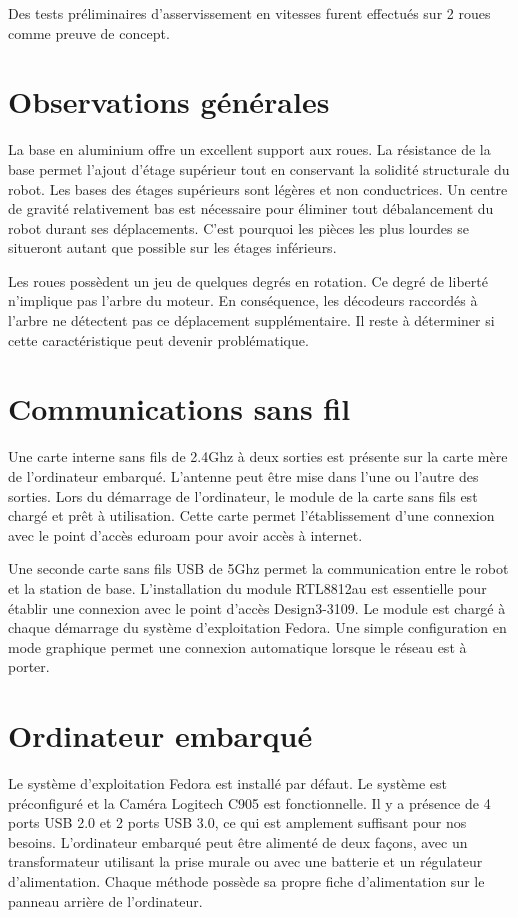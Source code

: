Des tests préliminaires d'asservissement en vitesses furent effectués sur 2 roues comme preuve de concept. 

\section{Observations générales}
  La base en aluminium offre un excellent support aux roues. La résistance de la base permet l’ajout d’étage supérieur tout en conservant la solidité structurale du robot. Les bases des étages supérieurs sont légères et non conductrices. Un centre de gravité relativement bas est nécessaire pour éliminer tout débalancement du robot durant ses déplacements. C’est pourquoi les pièces les plus lourdes se situeront autant que possible sur les étages inférieurs.

Les roues possèdent un jeu de quelques degrés en rotation. Ce degré de liberté n’implique pas l’arbre du moteur. En conséquence, les décodeurs raccordés à l’arbre ne détectent pas ce déplacement supplémentaire. Il reste à déterminer si cette caractéristique peut devenir problématique. 


\section{Communications sans fil}
 Une carte interne sans fils de 2.4Ghz à deux sorties est présente sur la carte mère de l’ordinateur embarqué. L’antenne peut être mise dans l’une ou l’autre des sorties. Lors du démarrage de l’ordinateur, le module de la carte sans fils est chargé et prêt à utilisation. Cette carte permet l’établissement d’une connexion avec le point d’accès eduroam pour avoir accès à internet. 
 
 Une seconde carte sans fils USB de 5Ghz permet la communication entre le robot et la station de base. L’installation du module RTL8812au est essentielle pour établir une connexion avec le point d’accès Design3-3109. Le module est chargé à chaque démarrage du système d’exploitation Fedora. Une simple configuration en mode graphique permet une connexion automatique lorsque le réseau est à porter. 

\section{Ordinateur embarqué}
 Le système d’exploitation Fedora est installé par défaut. Le système est préconfiguré et la Caméra Logitech C905 est fonctionnelle.  Il y a présence de 4 ports USB 2.0 et 2 ports USB 3.0, ce qui est amplement suffisant pour nos besoins. L’ordinateur embarqué peut être alimenté de deux façons, avec un transformateur utilisant la prise murale ou avec une batterie et un régulateur d’alimentation. Chaque méthode possède sa propre fiche d’alimentation sur le panneau arrière de l’ordinateur. 


